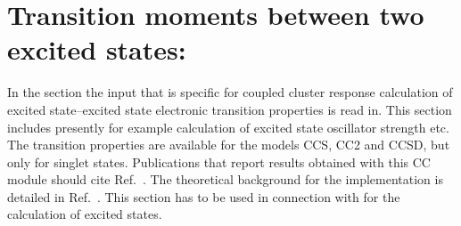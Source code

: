 
\section{Transition moments between two excited states: }
\label{sec:ccqr2r}

In the  section the input that is
specific for coupled cluster response calculation of excited state--excited state
electronic transition properties is read in.
This section includes presently for example calculation of excited state
oscillator strength etc.
The transition properties are available for the models CCS, CC2 and CCSD,
but only for singlet states.
Publications that report results obtained with this CC module should cite Ref.\ \cite{Christiansen:CCLR}.
The theoretical background for the implementation is detailed in Ref.\ \cite{Christiansen:QEL}.
This section has to be used in connection with  for the 
calculation of excited states.

